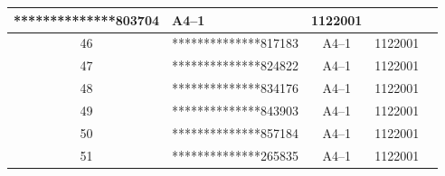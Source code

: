 \documentclass[UTF8,10pt,a4paper,fontset=fandol]{ctexart}
\newcommand{\fieldvalue}[1]{#1}
\begin{document}
\begin{center}
\begin{tabular}{|c|p{4.2cm}|c|c|p{2.0cm}|}
\fieldvalue{**************803704} &
\fieldvalue{A4--1} &
\fieldvalue{1122001} & \\ \hline
\fieldvalue{46} &
\fieldvalue{**************817183} &
\fieldvalue{A4--1} &
\fieldvalue{1122001} & \\ \hline
\fieldvalue{47} &
\fieldvalue{**************824822} &
\fieldvalue{A4--1} &
\fieldvalue{1122001} & \\ \hline
\fieldvalue{48} &
\fieldvalue{**************834176} &
\fieldvalue{A4--1} &
\fieldvalue{1122001} & \\ \hline
\fieldvalue{49} &
\fieldvalue{**************843903} &
\fieldvalue{A4--1} &
\fieldvalue{1122001} & \\ \hline
\fieldvalue{50} &
\fieldvalue{**************857184} &
\fieldvalue{A4--1} &
\fieldvalue{1122001} & \\ \hline
\fieldvalue{51} &
\fieldvalue{**************265835} &
\fieldvalue{A4--1} &
\fieldvalue{1122001} & \\ \hline

\end{tabular}
\end{center}
\end{document}
